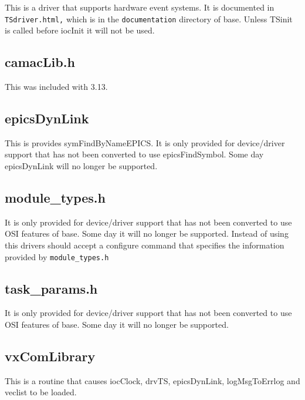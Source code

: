 This is a driver that supports hardware event systems. It is documented in \verb|TSdriver.html,| which is in the 
\verb|documentation| directory of base. Unless TSinit is called before iocInit it will not be used.

\subsection{camacLib.h}

This was included with 3.13.

\subsection{epicsDynLink}

This is provides symFindByNameEPICS. It is only provided for device/driver support that has not been converted to use 
epicsFindSymbol. Some day epicsDynLink will no longer be supported.

\subsection{module\_types.h}

It is only provided for device/driver support that has not been converted to use OSI features of base. Some day it will no 
longer be supported. Instead of using this drivers should accept a configure command that specifies the information 
provided by \verb|module_types.h|

\subsection{task\_params.h}

It is only provided for device/driver support that has not been converted to use OSI features of base. Some day it will no 
longer be supported.

\subsection{vxComLibrary}

This is a routine that causes iocClock, drvTS, epicsDynLink, logMsgToErrlog and veclist to be loaded.


